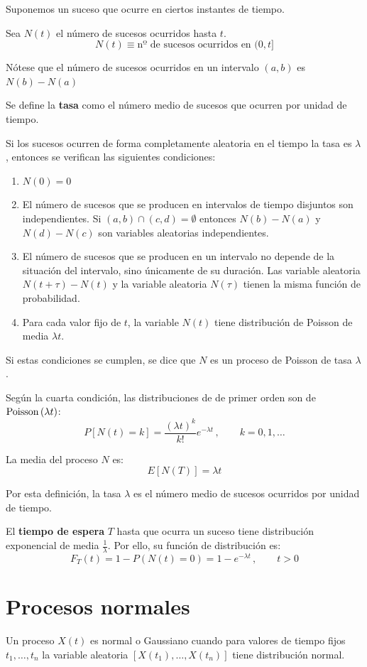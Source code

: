 \documentclass[a4paper]{book}
\begin{document}
Suponemos un suceso que ocurre en ciertos instantes de tiempo.

Sea $N(t)$ el número de sucesos ocurridos hasta $t$.
\[ N(t) \equiv \text{nº de sucesos ocurridos en }(0,t] \]

Nótese que el número de sucesos ocurridos en un intervalo $(a,b)$ es $N(b)-N(a)$

Se define la \textbf{tasa} como el número medio de sucesos que ocurren por unidad de tiempo.

Si los sucesos ocurren de forma completamente aleatoria en el tiempo la tasa es $\lambda$, entonces se verifican las siguientes condiciones:
\begin{enumerate}
	 \item $N(0)=0$
	 \item El número de sucesos que se producen en intervalos de tiempo disjuntos son independientes. Si $(a,b) \cap (c,d) = \emptyset$ entonces $N(b)-N(a)$ y $N(d)-N(c)$ son variables aleatorias independientes.
	 \item El número de sucesos que se producen en un intervalo no depende de la situación del intervalo, sino únicamente de su duración. Las variable aleatoria $N(t+\tau ) - N(t)$ y la variable aleatoria $N(\tau )$ tienen la misma función de probabilidad.
	 \item Para cada valor fijo de $t$, la variable $N(t)$ tiene distribución de Poisson de media $\lambda t$.
\end{enumerate}

Si estas condiciones se cumplen, se dice que $N$ es un proceso de Poisson de tasa $\lambda $.

Según la cuarta condición, las distribuciones de de primer orden son de $\operatorname{Poisson} \left( \lambda t \right)$:
\[ P \left[ N(t) = k \right] = \frac{\left( \lambda t \right)^k}{k!}e^{-\lambda t} \, , \qquad k = 0, 1, \dots \]

La media del proceso $N$ es:
\[ E \left[ N(T) \right] = \lambda t\]

Por esta definición, la tasa $\lambda$ es el número medio de sucesos ocurridos por unidad de tiempo.

El \textbf{tiempo de espera} $T$ hasta que ocurra un suceso tiene distribución exponencial de media $\frac{1}{\lambda}$. Por ello, su función de distribución es:
\[ F_T(t) = 1-P \left( N(t) =0 \right) = 1 - e^{-\lambda t} \, , \qquad t>0\]

\section{Procesos normales}
Un proceso $X(t)$ es normal o Gaussiano cuando para valores de tiempo fijos $t_1, \dots , t_n$ la variable aleatoria $\left[ X(t_1), \dots , X(t_n) \right]$ tiene distribución normal.
\end{document}

